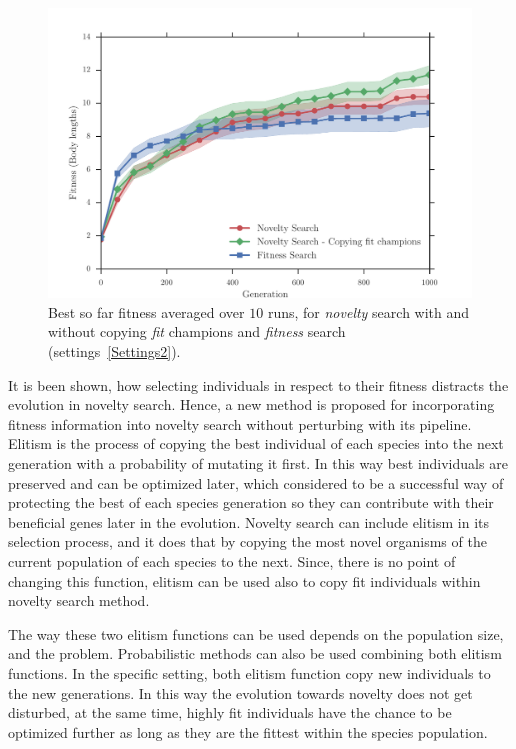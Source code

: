 \begin{figure}[t!]
\centering
\includegraphics[width=1.0\textwidth]{../Figures/Results/CopyFitChampions10.pdf}
\caption{Best so far fitness averaged over $10$ runs, for \emph{novelty} search with and without copying \emph{fit} champions and \emph{fitness} search (settings~\ref{Settings2}).}
\label{fig:CopyFitChampions10}
\end{figure}

It is been shown, how selecting individuals in respect to their fitness distracts the evolution in novelty search. Hence, a new method is proposed for incorporating fitness information into novelty search without perturbing with its pipeline. Elitism is the process of copying the best individual of each species into the next generation with a probability of mutating it first. In this way best individuals are preserved and can be optimized later, which considered to be a successful way of protecting the best of each species generation so they can contribute with their beneficial genes later in the evolution. Novelty search can include elitism in its selection process, and it does that by copying the most novel organisms of the current population of each species to the next. Since, there is no point of changing this function, elitism can be used also to copy fit individuals within novelty search method. 

The way these two elitism functions can be used depends on the population size, and the problem. Probabilistic methods can also be used combining both elitism functions. In the specific setting, both elitism function copy new individuals to the new generations. In this way the evolution towards novelty does not get disturbed, at the same time, highly fit individuals have the chance to be optimized further as long as they are the fittest within the species population.










